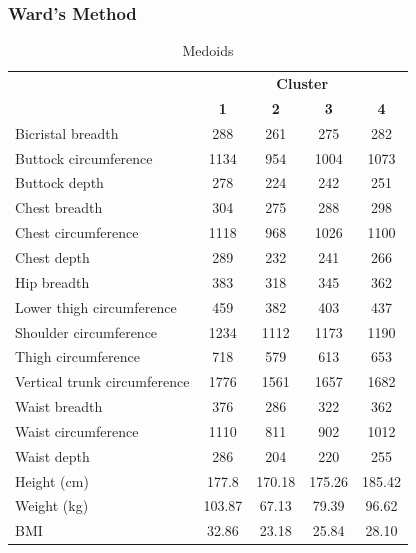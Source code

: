 \documentclass[12pt,a4paper,openany,UKenglish]{scrreprt}
\begin{document}
\subsubsection{Ward's Method}
\begin{table}[H]
	\footnotesize
	\centering
	\caption{Medoids}
	\begin{tabular}{lcccc}
		\cline{2-5}
		                             & \multicolumn{4}{c}{\textbf{Cluster}}                                        \\
		                             & \textbf{1}                           & \textbf{2} & \textbf{3} & \textbf{4} \\
		\hline\hline
		Bicristal breadth            & 288                                  & 261        & 275        & 282        \\
		Buttock circumference        & 1134                                 & 954        & 1004       & 1073       \\
		Buttock depth                & 278                                  & 224        & 242        & 251        \\
		Chest breadth                & 304                                  & 275        & 288        & 298        \\
		Chest circumference          & 1118                                 & 968        & 1026       & 1100       \\
		Chest depth                  & 289                                  & 232        & 241        & 266        \\
		Hip breadth                  & 383                                  & 318        & 345        & 362        \\
		Lower thigh circumference    & 459                                  & 382        & 403        & 437        \\
		Shoulder circumference       & 1234                                 & 1112       & 1173       & 1190       \\
		Thigh circumference          & 718                                  & 579        & 613        & 653        \\
		Vertical trunk circumference & 1776                                 & 1561       & 1657       & 1682       \\
		Waist breadth                & 376                                  & 286        & 322        & 362        \\
		Waist circumference          & 1110                                 & 811        & 902        & 1012       \\
		Waist depth                  & 286                                  & 204        & 220        & 255        \\
		\hline
		Height (cm)                  & 177.8                                & 170.18     & 175.26     & 185.42     \\
		Weight (kg)                  & 103.87                               & 67.13      & 79.39      & 96.62      \\
		BMI                          & 32.86                                & 23.18      & 25.84      & 28.10
	\end{tabular}
\end{table}
\end{document}
